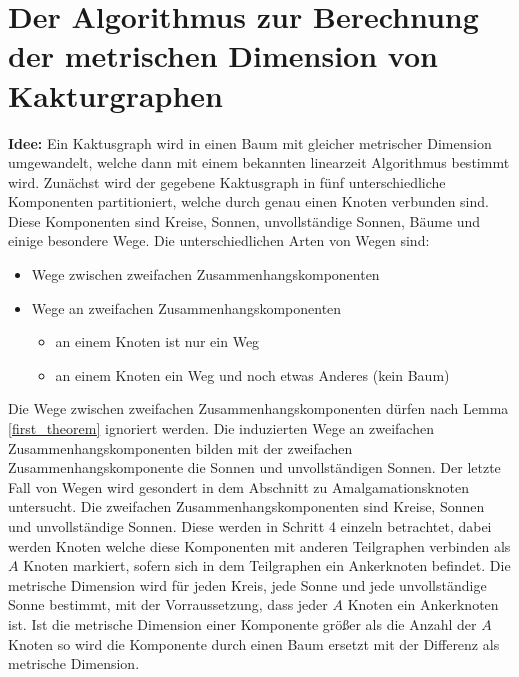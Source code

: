 \section{Der Algorithmus zur Berechnung der metrischen Dimension von Kakturgraphen}
\textbf{Idee:} Ein Kaktusgraph wird in einen Baum mit gleicher metrischer Dimension umgewandelt, welche dann mit einem bekannten linearzeit Algorithmus bestimmt wird.\newline\newline
Zunächst wird der gegebene Kaktusgraph in fünf unterschiedliche Komponenten partitioniert, welche durch genau einen Knoten verbunden sind. Diese Komponenten sind Kreise, Sonnen, unvollständige Sonnen, Bäume und einige besondere Wege.\newline\newline
Die unterschiedlichen Arten von Wegen sind:
\begin{itemize}
\item Wege zwischen zweifachen Zusammenhangskomponenten
\item Wege an zweifachen Zusammenhangskomponenten
\begin{itemize}
\item an einem Knoten ist nur ein Weg
\item an einem Knoten ein Weg und noch etwas Anderes (kein Baum)
\end{itemize}
\end{itemize}
Die Wege zwischen zweifachen Zusammenhangskomponenten dürfen nach Lemma \ref{first_theorem} ignoriert werden. Die induzierten Wege an zweifachen Zusammenhangskomponenten bilden mit der zweifachen Zusammenhangskomponente die Sonnen und unvollständigen Sonnen. Der letzte Fall von Wegen wird gesondert in dem Abschnitt zu Amalgamationsknoten untersucht.\newline\newline
Die zweifachen Zusammenhangskomponenten sind Kreise, Sonnen und unvollständige Sonnen. Diese werden in Schritt 4 einzeln betrachtet, dabei werden Knoten welche diese Komponenten mit anderen Teilgraphen verbinden als $A$ Knoten markiert, sofern sich in dem Teilgraphen ein Ankerknoten befindet. Die metrische Dimension wird für jeden Kreis, jede Sonne und jede unvollständige Sonne bestimmt, mit der Vorraussetzung, dass jeder $A$ Knoten ein Ankerknoten ist.\newline
Ist die metrische Dimension einer Komponente größer als die Anzahl der $A$ Knoten so wird die Komponente durch einen Baum ersetzt mit der Differenz als metrische Dimension.\newline\newline
